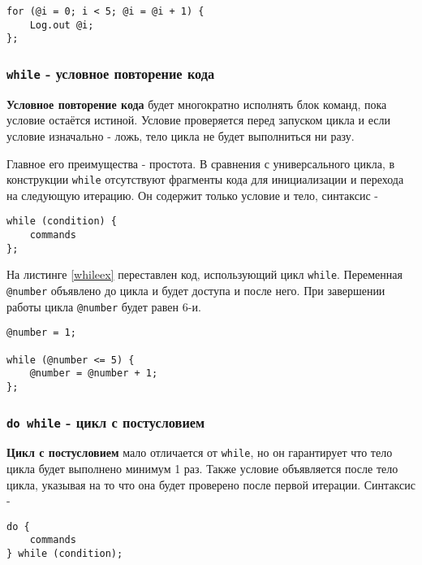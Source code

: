\begin{sourcecode}
\label{uniloopex}
\begin{verbatim}
for (@i = 0; i < 5; @i = @i + 1) {
	Log.out @i;
};
\end{verbatim}
\end{sourcecode}

\subsubsection{\texttt{while} - условное повторение кода}

{\bf Условное повторение кода} будет многократно исполнять блок команд, пока условие остаётся истиной. Условие проверяется перед запуском цикла и если условие изначально - ложь, тело цикла не будет выполниться ни разу.

Главное его преимущества - простота. В сравнения с универсального цикла, в конструкции \texttt{while} отсутствуют фрагменты кода для инициализации и перехода на следующую итерацию. Он содержит только условие и тело, синтаксис -
\begin{verbatim}
while (condition) {
	commands
};
\end{verbatim}

На листинге \ref{whileex} переставлен код, использующий цикл \texttt{while}. Переменная \texttt{@number} объявлено до цикла и будет доступа и после него. При завершении работы цикла \texttt{@number} будет равен 6-и.

\begin{sourcecode}
\label{whileex}
\begin{verbatim}
@number = 1;

while (@number <= 5) {
	@number = @number + 1;
};
\end{verbatim}
\end{sourcecode}

\subsubsection{\texttt{do while} - цикл с постусловием}

{\bf Цикл с постусловием} мало отличается от \texttt{while}, но он гарантирует что тело цикла будет выполнено минимум 1 раз. Также условие объявляется после тело цикла, указывая на то что она будет проверено после первой итерации. Синтаксис -
\begin{verbatim}
do {
	commands
} while (condition);
\end{verbatim}

